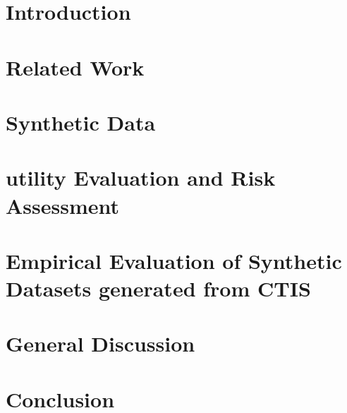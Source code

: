 \documentclass[12pt]{article}
\begin{document}
\newpage


    
\section{Introduction}
\label{chapter1:intro}

\newpage

\section{Related Work}
\label{chapter2:relatedwork}

\newpage

\section{Synthetic Data}
\label{chapter3:syn}

\newpage

\section{utility Evaluation and Risk Assessment}
\label{chapter4:eva}

\newpage

\section{Empirical Evaluation of Synthetic Datasets generated from CTIS}
\label{chapter5:ctis}

\newpage

\section{General Discussion}
\label{chapter6:discussion}


\section{Conclusion}
\label{chapter7:conclusion}


\newpage

    
\end{document}
